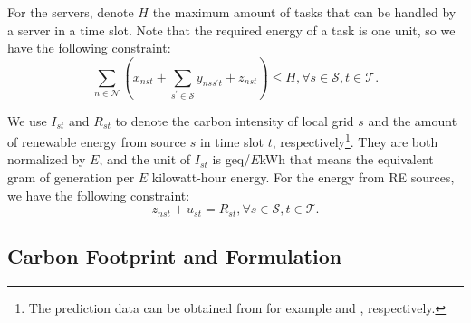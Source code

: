 \documentclass[conference, 10pt, ﬁnal, letterpaper, twocolumn]{IEEEtran}
\begin{document}
For the servers, denote $H$ the maximum amount of tasks that can be handled by a server in a time slot. Note that the required energy of a task is one unit, so we have the following constraint:
\begin{equation}\label{c4}
    \sum_{n \in \mathcal{N}}(x_{nst}+\sum_{s^\prime \in\mathcal{S}} y_{nss^\prime t} +z_{nst}) \leq H, \forall s \in \mathcal{S}, t \in \mathcal{T}.
\end{equation}

We use $I_{st}$ and $R_{st}$ to denote the carbon intensity of local grid $s$ and the amount of renewable energy from source $s$ in time slot $t$, respectively\footnote{The prediction data can be obtained from for example \cite{ElectricityMaps} and \cite{li2019renewable}, respectively.}. They are both normalized by $E$, and the unit of $I_{st}$ is geq/$E$kWh that means the equivalent gram of  generation per $E$ kilowatt-hour energy. For the energy from RE sources, we have the following constraint:
\begin{equation}\label{c5}
    z_{nst} + u_{st} = R_{st}, \forall s \in \mathcal{S}, t \in \mathcal{T}.
\end{equation}

\subsection{Carbon Footprint and Formulation} \label{subsec:CFA}
\end{document}
